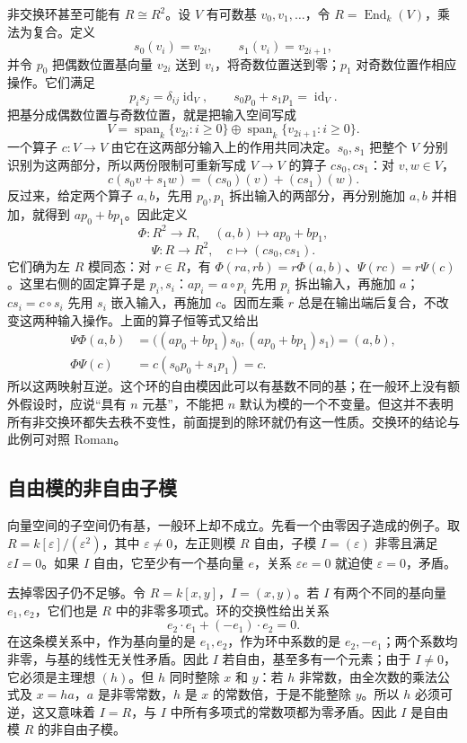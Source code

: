 \ProseParagraphBreak
非交换环甚至可能有 \(R\cong R^2\)。设 \(V\) 有可数基 \(v_0,v_1,\ldots\)，令 \(R=\operatorname{End}_k(V)\)，乘法为复合。定义
\[
	s_0(v_i)=v_{2i},\qquad s_1(v_i)=v_{2i+1},
\]
并令 \(p_0\) 把偶数位置基向量 \(v_{2i}\) 送到 \(v_i\)，将奇数位置送到零；\(p_1\) 对奇数位置作相应操作。它们满足
\[
	p_i s_j=\delta_{ij}\operatorname{id}_V,\qquad s_0p_0+s_1p_1=\operatorname{id}_V.
\]
把基分成偶数位置与奇数位置，就是把输入空间写成
\[
	V=\operatorname{span}_k\{v_{2i}:i\geq0\} \oplus\operatorname{span}_k\{v_{2i+1}:i\geq0\}.
\]
一个算子 \(c:V\to V\) 由它在这两部分输入上的作用共同决定。\(s_0,s_1\) 把整个 \(V\) 分别识别为这两部分，所以两份限制可重新写成 \(V\to V\) 的算子 \(cs_0,cs_1\)：对 \(v,w\in V\)，
\[
	c(s_0v+s_1w)=(cs_0)(v)+(cs_1)(w).
\]
反过来，给定两个算子 \(a,b\)，先用 \(p_0,p_1\) 拆出输入的两部分，再分别施加 \(a,b\) 并相加，就得到 \(ap_0+bp_1\)。因此定义
\[
	\Phi:R^2\longrightarrow R,\quad(a,b)\longmapsto ap_0+bp_1,
\]
\[
	\Psi:R\longrightarrow R^2,\quad c\longmapsto(cs_0,cs_1).
\]
它们确为左 \(R\) 模同态：对 \(r\in R\)，有 \(\Phi(ra,rb)=r\Phi(a,b)\)、\(\Psi(rc)=r\Psi(c)\)。这里右侧的固定算子是 \(p_i,s_i\)：\(ap_i=a\circ p_i\) 先用 \(p_i\) 拆出输入，再施加 \(a\)；\(cs_i=c\circ s_i\) 先用 \(s_i\) 嵌入输入，再施加 \(c\)。因而左乘 \(r\) 总是在输出端后复合，不改变这两种输入操作。上面的算子恒等式又给出
\[
	\begin{aligned}
		\Psi\Phi(a,b)&=\bigl((ap_0+bp_1)s_0,(ap_0+bp_1)s_1\bigr)=(a,b),\\
		\Phi\Psi(c)&=c(s_0p_0+s_1p_1)=c.
	\end{aligned}
\]
所以这两映射互逆。这个环的自由模因此可以有基数不同的基；在一般环上没有额外假设时，应说“具有 \(n\) 元基”，不能把 \(n\) 默认为模的一个不变量。但这并不表明所有非交换环都失去秩不变性，前面提到的除环就仍有这一性质。交换环的结论与此例可对照 Roman\cite[Chapter 5, Theorem 5.1; Example 5.1, pp. 129--130]{Roman2008AdvancedLinearAlgebra}。

\subsection{自由模的非自由子模}
\label{b2:subsec:0301:03}

向量空间的子空间仍有基，一般环上却不成立。先看一个由零因子造成的例子。取 \(R=k[\varepsilon]/(\varepsilon^2)\)，其中 \(\varepsilon\ne0\)，左正则模 \(R\) 自由，子模 \(I=(\varepsilon)\) 非零且满足 \(\varepsilon I=0\)。如果 \(I\) 自由，它至少有一个基向量 \(e\)，关系 \(\varepsilon e=0\) 就迫使 \(\varepsilon=0\)，矛盾。

\ProseParagraphBreak
去掉零因子仍不足够。令 \(R=k[x,y]\)，\(I=(x,y)\)。若 \(I\) 有两个不同的基向量 \(e_1,e_2\)，它们也是 \(R\) 中的非零多项式。环的交换性给出关系
\[
	e_2\cdot e_1+(-e_1)\cdot e_2=0.
\]
在这条模关系中，作为基向量的是 \(e_1,e_2\)，作为环中系数的是 \(e_2,-e_1\)；两个系数均非零，与基的线性无关性矛盾。因此 \(I\) 若自由，基至多有一个元素；由于 \(I\ne0\)，它必须是主理想 \((h)\)。但 \(h\) 同时整除 \(x\) 和 \(y\)：若 \(h\) 非常数，由全次数的乘法公式及 \(x=ha\)，\(a\) 是非零常数，\(h\) 是 \(x\) 的常数倍，于是不能整除 \(y\)。所以 \(h\) 必须可逆，这又意味着 \(I=R\)，与 \(I\) 中所有多项式的常数项都为零矛盾。因此 \(I\) 是自由模 \(R\) 的非自由子模。

